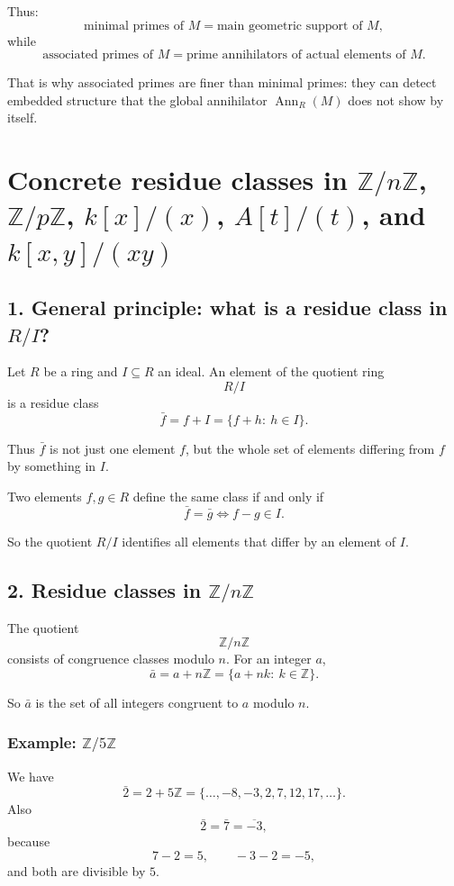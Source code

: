 \documentclass[12pt,a4paper,oneside]{report}
\DeclareMathOperator{\Ann}{Ann}
\theoremstyle{notespace}
\begin{document}
	Thus:
	\[
	\text{minimal primes of }M
	=
	\text{main geometric support of }M,
	\]
	while
	\[
	\text{associated primes of }M
	=
	\text{prime annihilators of actual elements of }M.
	\]
	
	That is why associated primes are finer than minimal primes: they can detect embedded structure that the global annihilator \(\Ann_R(M)\) does not show by itself.
	
	\section{Concrete residue classes in \(\mathbb Z/n\mathbb Z\), \(\mathbb Z/p\mathbb Z\), \(k[x]/(x)\), \(A[t]/(t)\), and \(k[x,y]/(xy)\)}
	
	\subsection{1. General principle: what is a residue class in \(R/I\)?}
	
	Let \(R\) be a ring and \(I\subseteq R\) an ideal. An element of the quotient ring
	\[
	R/I
	\]
	is a residue class
	\[
	\bar f=f+I=\{f+h:\ h\in I\}.
	\]
	
	Thus \(\bar f\) is not just one element \(f\), but the whole set of elements differing from \(f\) by something in \(I\).
	
	Two elements \(f,g\in R\) define the same class if and only if
	\[
	\bar f=\bar g
	\iff
	f-g\in I.
	\]
	
	So the quotient \(R/I\) identifies all elements that differ by an element of \(I\).
	
	\subsection{2. Residue classes in \(\mathbb Z/n\mathbb Z\)}
	
	The quotient
	\[
	\mathbb Z/n\mathbb Z
	\]
	consists of congruence classes modulo \(n\). For an integer \(a\),
	\[
	\bar a=a+n\mathbb Z=\{a+nk:\ k\in \mathbb Z\}.
	\]
	
	So \(\bar a\) is the set of all integers congruent to \(a\) modulo \(n\).
	
	\subsubsection{Example: \(\mathbb Z/5\mathbb Z\)}
	
	We have
	\[
	\bar 2=2+5\mathbb Z=\{\dots,-8,-3,2,7,12,17,\dots\}.
	\]
	Also
	\[
	\bar 2=\bar 7=\overline{-3},
	\]
	because
	\[
	7-2=5,\qquad -3-2=-5,
	\]
	and both are divisible by \(5\).
	
\end{document}
